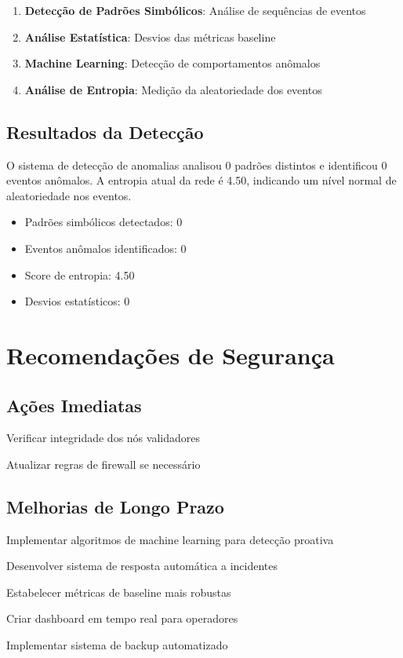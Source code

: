 \documentclass[12pt,a4paper]{article}
\begin{document}
\begin{enumerate}
    \item \textbf{Detecção de Padrões Simbólicos}: Análise de sequências de eventos
    \item \textbf{Análise Estatística}: Desvios das métricas baseline
    \item \textbf{Machine Learning}: Detecção de comportamentos anômalos
    \item \textbf{Análise de Entropia}: Medição da aleatoriedade dos eventos
\end{enumerate}

\subsection{Resultados da Detecção}


O sistema de detecção de anomalias analisou 0 padrões distintos e identificou 0 eventos anômalos.
A entropia atual da rede é 4.50, indicando um nível normal de aleatoriedade nos eventos.

\begin{itemize}
\item Padrões simbólicos detectados: 0
\item Eventos anômalos identificados: 0
\item Score de entropia: 4.50
\item Desvios estatísticos: 0
\end{itemize}


\section{Recomendações de Segurança}

\subsection{Ações Imediatas}

\item Verificar integridade dos nós validadores
\item Atualizar regras de firewall se necessário

\subsection{Melhorias de Longo Prazo}

\item Implementar algoritmos de machine learning para detecção proativa
\item Desenvolver sistema de resposta automática a incidentes
\item Estabelecer métricas de baseline mais robustas
\item Criar dashboard em tempo real para operadores
\item Implementar sistema de backup automatizado
\end{document}
